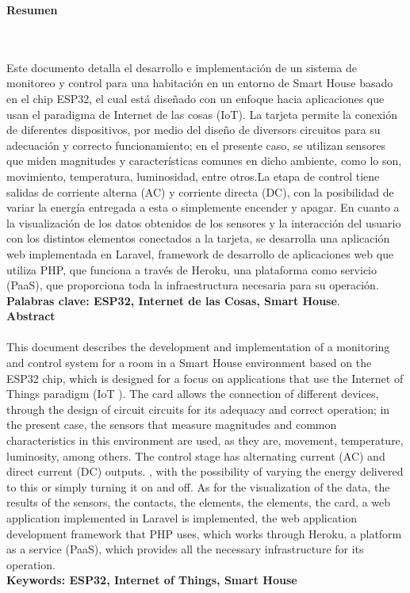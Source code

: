 \newpage
\thispagestyle{empty} \textbf{}\normalsize
\textbf{\LARGE Resumen}
\markboth{}{}
\\\\
 Este documento detalla el desarrollo e implementación de un sistema de monitoreo y control para una habitación en un entorno de Smart House basado en el chip ESP32, el cual está diseñado con un enfoque hacia aplicaciones que usan el paradigma de Internet de las cosas (IoT). La tarjeta permite la conexión de diferentes dispositivos, por medio del diseño de diversors circuitos para su adecuación y correcto funcionamiento; en el presente caso, se utilizan sensores que miden magnitudes y características comunes en dicho ambiente, como lo son, movimiento, temperatura, luminosidad, entre otros.La etapa de control tiene salidas de corriente alterna (AC) y corriente directa (DC), con la posibilidad de variar la energía entregada a esta o simplemente encender y apagar. En cuanto a la visualización de los datos obtenidos de los sensores y la interacción del usuario con los distintos elementos conectados a la tarjeta, se desarrolla una aplicación web implementada en Laravel, framework de desarrollo de aplicaciones web que utiliza PHP, que funciona a través de Heroku, una plataforma como servicio (PaaS), que proporciona toda la infraestructura necesaria para su operación.\\
 
\textbf{\small Palabras clave: ESP32, Internet de las Cosas, Smart House}.\\[1.0cm]

\textbf{\LARGE Abstract}\\\\
This document describes the development and implementation of a monitoring and control system for a room in a Smart House environment based on the ESP32 chip, which is designed for a focus on applications that use the Internet of Things paradigm (IoT ). The card allows the connection of different devices, through the design of circuit circuits for its adequacy and correct operation; in the present case, the sensors that measure magnitudes and common characteristics in this environment are used, as they are, movement, temperature, luminosity, among others. The control stage has alternating current (AC) and direct current (DC) outputs. , with the possibility of varying the energy delivered to this or simply turning it on and off. As for the visualization of the data, the results of the sensors, the contacts, the elements, the elements, the card, a web application implemented in Laravel is implemented, the web application development framework that PHP uses, which works through Heroku, a platform as a service (PaaS), which provides all the necessary infrastructure for its operation.\\

\textbf{\small Keywords: ESP32, Internet of Things, Smart House}